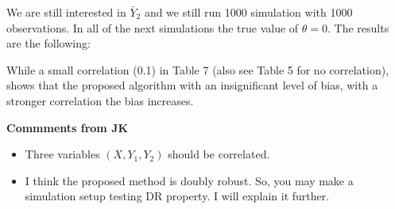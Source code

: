 \documentclass[12pt]{article}
\begin{document}
\begin{itemize}
    We are still interested in $\bar Y_2$ and we still run 1000 simulation with
    1000 observations. In all of the next simulations the true value of $\theta
    = 0$. The results are the following:

    
    
    

    \newpage

    While a small correlation (0.1) in Table 7 (also see Table 5 for no
    correlation), shows that the proposed algorithm with an insignificant level
    of bias, with a stronger correlation the bias increases.
\end{itemize}


{\bf Commments from JK}
\begin{itemize}
    \item Three variables $(X, Y_1, Y_2)$ should be correlated. 
    \item I think the proposed method is doubly robust. So, you may make a
      simulation setup testing DR property. I will explain it further. 
\end{itemize}

\newpage

\printbibliography
\end{document}
